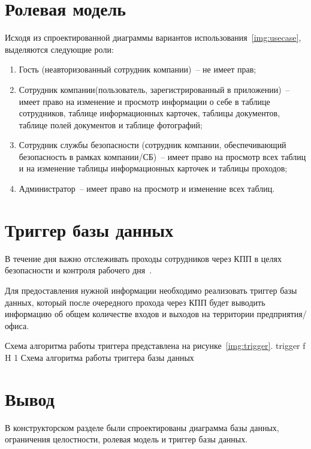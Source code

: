 \section{Ролевая модель}

Исходя из спроектированной диаграммы вариантов использования~\ref{img:usecase}, выделяются следующие роли:
\begin{enumerate}
	\item Гость (неавторизованный сотрудник компании)~-- не имеет прав;
	\item Сотрудник компании(пользователь, зарегистрированный в приложении)~-- имеет право на изменение и просмотр информации о себе в таблице сотрудников, таблице информационных карточек, таблицы документов, таблице полей документов и таблице фотографий;
	\item Сотрудник службы безопасности (сотрудник компании, обеспечивающий безопасность в рамках компании/СБ)~-- имеет право на просмотр всех таблиц и на изменение таблицы информационных карточек и таблицы проходов;
	\item Администратор~-- имеет право на просмотр и изменение всех таблиц.
\end{enumerate}

\section{Триггер базы данных}

В течение дня важно отслеживать проходы сотрудников через КПП в целях безопасности и контроля рабочего дня~\cite{introCPP}.

Для предоставления нужной информации необходимо реализовать триггер базы данных, который после очередного прохода через КПП будет выводить информацию об общем количестве входов и выходов на территории предприятия/офиса.

Схема алгоритма работы триггера представлена на рисунке~\ref{img:trigger}.
	{trigger}
	{f}
	{H}
	{1\textwidth}
	{Схема алгоритма работы триггера базы данных}

\section{Вывод}

В конструкторском разделе были спроектированы диаграмма базы данных, ограничения целостности, ролевая модель и триггер базы данных.